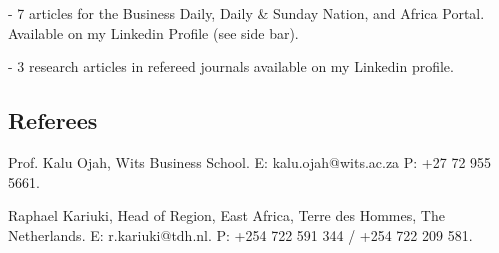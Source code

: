 \documentclass[letterpaper]{twentysecondcv} %
\begin{document}
- 7 articles for the Business Daily, Daily \& Sunday Nation, and Africa Portal. Available on my Linkedin Profile (see side bar). 

- 3 research articles in refereed journals available on my Linkedin profile. 

\subsection{Referees}

Prof. Kalu Ojah, Wits Business School. E: kalu.ojah@wits.ac.za P: +27 72 955 5661.

Raphael Kariuki, Head of Region, East Africa, Terre des Hommes, The Netherlands. E: r.kariuki@tdh.nl. P: +254 722 591 344 / +254 722 209 581. 







\end{document}
